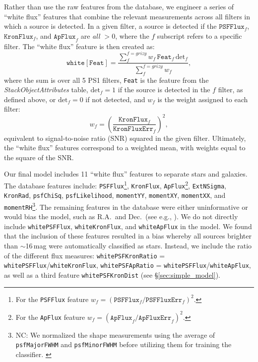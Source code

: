\documentclass[twocolumn]{aastex62}
\newcommand{\NC}[1]{{\color{brown} NC: {#1}}}
\begin{document}
Rather than use the raw features from the database, we engineer a series of ``white flux'' features that combine the relevant measurements across all filters in which a source is detected. In a given filter, a source is detected if the $\mathtt{PSFFlux}_f$, $\mathtt{KronFlux}_f$, and $\mathtt{ApFlux}_f$ are \textit{all $> 0$}, where the $f$ subscript refers to a specific filter. The ``white flux'' feature is then created as:
%
\begin{equation}
    \mathtt{white[Feat]} =  \frac{\sum_f^{f = grizy} w_f  \, \mathtt{Feat}_f \, \mathrm{det}_f}{\sum_f^{f = grizy} w_f}, 
\end{equation}
%
where the sum is over all 5 PS1 filters, \texttt{Feat} is the feature from the \textit{StackObjectAttributes} table, $\mathrm{det}_f = 1$ if the source is detected in the $f$ filter, as defined above, or $\mathrm{det}_f = 0$ if not detected, and $w_f$ is the weight assigned to each filter:
%
\begin{equation}
    w_f = \left(\frac{\mathtt{KronFlux}_f}{\mathtt{KronFluxErr}_f}\right)^2,
\end{equation}
%
equivalent to signal-to-noise ratio (SNR) squared in the given filter. Ultimately, the ``white flux'' features correspond to a weighted mean, with weights equal to the square of the SNR. 

Our final model includes 11 ``white flux'' features to separate stars and galaxies. The database features include: \texttt{PSFFlux}\footnote{For the \texttt{PSFFlux} feature $w_f = (\mathtt{PSFFlux}_f/\mathtt{PSFFluxErr}_f)^2$.}, \texttt{KronFlux}, \texttt{ApFlux}\footnote{For the \texttt{ApFlux} feature $w_f = (\mathtt{ApFlux}_f/\mathtt{ApFluxErr}_f)^2$.}, \texttt{ExtNSigma}, \texttt{KronRad}, \texttt{psfChiSq}, \texttt{psfLikelihood}, \texttt{momentYY}, \texttt{momentXY}, \texttt{momentXX}, and \texttt{momentRH}\footnote{\NC{We normalized the shape measurements using the average of \texttt{psfMajorFWHM} and  \texttt{psfMinorFWHM} before utilizing them for training the classifier. }}. The remaining features in the database were either uninformative or would bias the model, such as R.A.\ and Dec.\ (see e.g., \citealt{Richards12a,Miller17}). We do not directly include \texttt{whitePSFFlux}, \texttt{whiteKronFlux}, and \texttt{whiteApFlux} in the model. We found that the inclusion of these features resulted in a bias whereby all sources brighter than $\sim$16\,mag were automatically classified as stars. Instead, we include the ratio of the different flux measures: \texttt{whitePSFKronRatio} = \texttt{whitePSFFlux}/\texttt{whiteKronFlux}, \texttt{whitePSFApRatio} = \texttt{whitePSFFlux}/\texttt{whiteApFlux}, as well as a third feature \texttt{whitePSFKronDist} (see \S\ref{sec:simple_model}).
\end{document}
